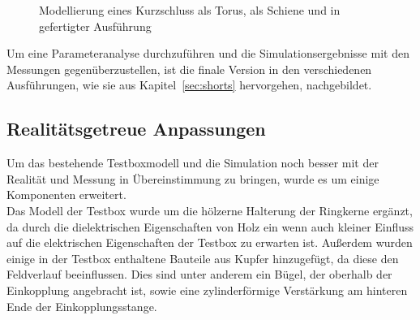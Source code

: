            \begin{figure}[htb]
                \centering
                \hspace{0.01\textwidth}
                \hspace{0.01\textwidth}
                \caption{Modellierung eines Kurzschluss \protect{} als Torus, \protect{} als Schiene und \protect{} in gefertigter Ausführung}
                \label{fig:KSCST}
            \end{figure}
        
        Um eine Parameteranalyse durchzuführen und die Simulationsergebnisse mit den Messungen gegenüberzustellen, ist die finale Version in den verschiedenen Ausführungen, wie sie aus Kapitel~\ref{sec:shorts} hervorgehen, nachgebildet.
        
        \subsection{Realitätsgetreue Anpassungen}
        
        
        Um das bestehende Testboxmodell und die Simulation noch besser mit der Realität und Messung in Übereinstimmung zu bringen, wurde es um einige Komponenten erweitert.\\
        Das Modell der Testbox wurde um die hölzerne Halterung der Ringkerne ergänzt, da durch die dielektrischen Eigenschaften von Holz ein wenn auch kleiner Einfluss auf die elektrischen Eigenschaften der Testbox zu erwarten ist. Außerdem wurden einige in der Testbox enthaltene Bauteile aus Kupfer hinzugefügt, da diese den Feldverlauf beeinflussen. Dies sind unter anderem ein Bügel, der oberhalb der Einkopplung angebracht ist, sowie eine zylinderförmige Verstärkung am hinteren Ende der Einkopplungsstange.
        
